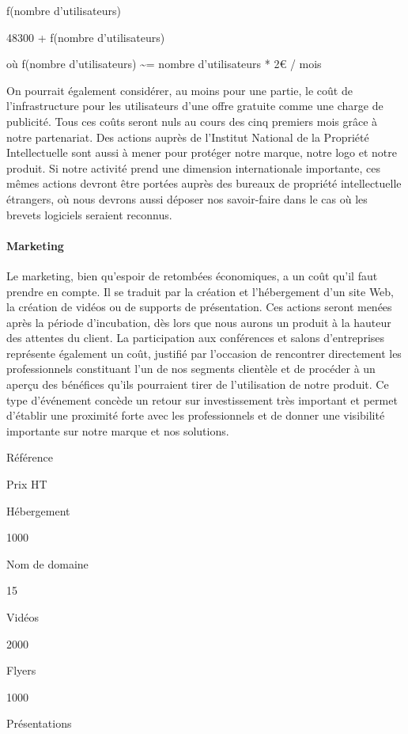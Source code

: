 \documentclass[10pt,twocolumn,a4paper,utf8x]{article}
\begin{document}
f(nombre d'utilisateurs)

48300 + f(nombre d'utilisateurs)

où f(nombre d'utilisateurs) \textasciitilde{}= nombre d'utilisateurs *
2\euro{} / mois

On pourrait également considérer, au moins pour une partie, le coût de
l'infrastructure pour les utilisateurs d'une offre gratuite comme une
charge de publicité. Tous ces coûts seront nuls au cours des cinq
premiers mois grâce à notre partenariat. Des actions auprès de
l'Institut National de la Propriété Intellectuelle sont aussi à mener
pour protéger notre marque, notre logo et notre produit. Si notre
activité prend une dimension internationale importante, ces mêmes
actions devront être portées auprès des bureaux de propriété
intellectuelle étrangers, où nous devrons aussi déposer nos savoir-faire
dans le cas où les brevets logiciels seraient reconnus.

\paragraph{Marketing}

Le marketing, bien qu'espoir de retombées économiques, a un coût qu'il
faut prendre en compte. Il se traduit par la création et l'hébergement
d'un site Web, la création de vidéos ou de supports de présentation. Ces
actions seront menées après la période d'incubation, dès lors que nous
aurons un produit à la hauteur des attentes du client. La participation
aux conférences et salons d'entreprises représente également un coût,
justifié par l'occasion de rencontrer directement les professionnels
constituant l'un de nos segments clientèle et de procéder à un aperçu
des bénéfices qu'ils pourraient tirer de l'utilisation de notre produit.
Ce type d'événement concède un retour sur investissement très important
et permet d'établir une proximité forte avec les professionnels et de
donner une visibilité importante sur notre marque et nos solutions.

Référence

Prix HT

Hébergement

1000

Nom de domaine

15

Vidéos

2000

Flyers

1000

Présentations
\end{document}
